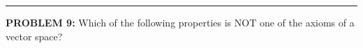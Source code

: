 \documentclass[12pt]{amsart}
\newcommand{\divider}{
  \vspace{-1em} %
  \noindent
  \raisebox{-0.15ex}{\textbullet}%
  \hspace{0.5em}%
  \rule[0.5ex]{0.95\textwidth}{1.0pt}%
  \hspace{0.5em}%
  \raisebox{-0.15ex}{\textbullet}%
  \vspace{0em} %
}
\begin{document}
%
%

\divider

{\bf PROBLEM 9:}
%
Which of the following properties is NOT one of the axioms of a vector space?
\end{document}
